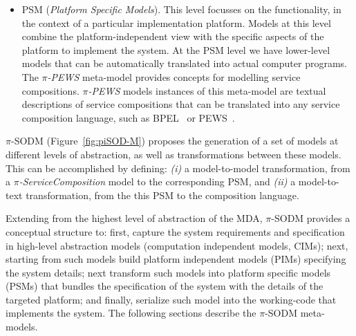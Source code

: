 \begin{itemize}
  \item PSM (\textit{Platform Specific Models}). This level focusses on the functionality, in the context of a particular implementation platform.
Models at this level combine the platform-independent view with the specific aspects of the platform to implement the system. At the PSM level we have lower-level models that can be automatically translated into actual computer programs. The \textit{$\pi$-PEWS} meta-model provides concepts for modelling service compositions. \textit{$\pi$-PEWS} models instances of this meta-model are textual descriptions of service compositions that can be translated into any service composition language, such as BPEL~\cite{bpel03} or PEWS~\cite{BaCAM05,Placido2010LTPD}.

\end{itemize}


$\pi$-SODM (Figure~\ref{fig:piSOD-M}) proposes the generation of a set of models at different levels of abstraction, as well as transformations between these models.
This can be accomplished by defining: \textit{(i)} a model-to-model transformation, from a \textit{$\pi$-ServiceComposition} model to the corresponding PSM, and \textit{(ii)} a model-to-text transformation, from the this PSM to the composition language.

Extending from the highest level of abstraction of the MDA, $\pi$-SODM provides  a conceptual structure to: first, capture the system requirements and specification in high-level abstraction models (computation independent models, CIMs); next,  starting from such models build platform independent models (PIMs) specifying the system details; next transform such models into platform specific models (PSMs) that bundles the specification of the system with the details of the targeted platform; and finally, serialize such model into the working-code that implements the system. 
The following sections describe the $\pi$-SODM meta-models.

%


